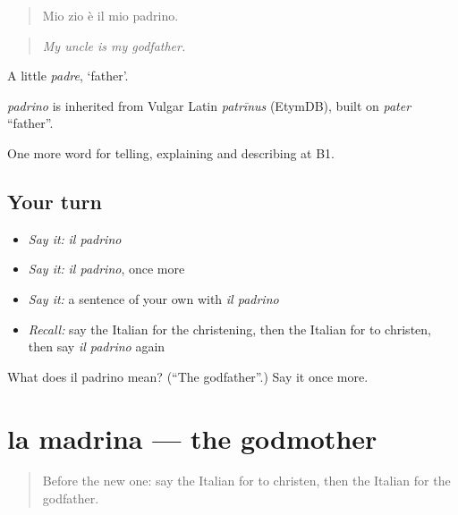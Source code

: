 \begin{quote}
Mio zio è il mio padrino.
\end{quote}

\begin{quote}
\emph{My uncle is my godfather.}
\end{quote}

A little \emph{padre}, ‘father’.

\begin{cousinweb}
\emph{padrino} is inherited from Vulgar Latin \emph{patrīnus} (EtymDB), built on \emph{pater} \textquotedblleft{}father\textquotedblright{}.
\end{cousinweb}

\begin{grammarlens}[title={What you've built}]
One more word for telling, explaining and describing at B1.
\end{grammarlens}

\subsection*{Your turn}
\begin{itemize}
\raggedright
  \item \emph{Say it:} \emph{il padrino}
  \item \emph{Say it:} \emph{il padrino}, once more
  \item \emph{Say it:} a sentence of your own with \emph{il padrino}
  \item \emph{Recall:} say the Italian for the christening, then the Italian for to christen, then say \emph{il padrino} again
\end{itemize}

\begin{tcolorbox}[breakable,colback=teal!4,colframe=teal!35!black,title={Before you move on}]
What does il padrino mean? (\textquotedblleft{}The godfather\textquotedblright{}.) Say it once more.
\end{tcolorbox}
\section[la madrina]{la madrina — the godmother}

\label{lesson:IT-C308-madrina}



\begin{quote}
Before the new one: say the Italian for to christen, then the Italian for the godfather.
\end{quote}

